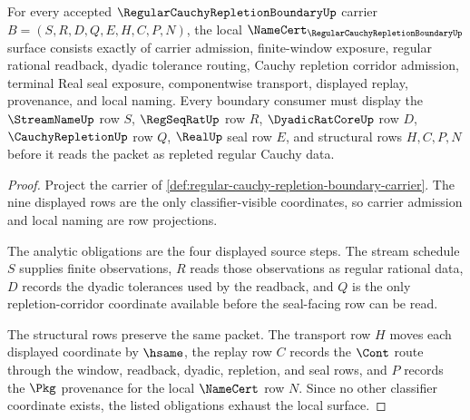 \begin{theorem}
\label{thm:regular-cauchy-repletion-boundary-namecert-obligations}
For every accepted $\RegularCauchyRepletionBoundaryUp$ carrier $B=(S,R,D,Q,E,H,C,P,N)$, the local $\NameCert_{\RegularCauchyRepletionBoundaryUp}$ surface consists exactly of carrier admission, finite-window exposure, regular rational readback, dyadic tolerance routing, Cauchy repletion corridor admission, terminal Real seal exposure, componentwise transport, displayed replay, provenance, and local naming. Every boundary consumer must display the $\StreamNameUp$ row $S$, $\RegSeqRatUp$ row $R$, $\DyadicRatCoreUp$ row $D$, $\CauchyRepletionUp$ row $Q$, $\RealUp$ seal row $E$, and structural rows $H,C,P,N$ before it reads the packet as repleted regular Cauchy data.
\end{theorem}
\begin{proof}
Project the carrier of \autoref{def:regular-cauchy-repletion-boundary-carrier}. The nine displayed rows are the only classifier-visible coordinates, so carrier admission and local naming are row projections.

The analytic obligations are the four displayed source steps. The stream schedule $S$ supplies finite observations, $R$ reads those observations as regular rational data, $D$ records the dyadic tolerances used by the readback, and $Q$ is the only repletion-corridor coordinate available before the seal-facing row can be read.

The structural rows preserve the same packet. The transport row $H$ moves each displayed coordinate by $\hsame$, the replay row $C$ records the $\Cont$ route through the window, readback, dyadic, repletion, and seal rows, and $P$ records the $\Pkg$ provenance for the local $\NameCert$ row $N$. Since no other classifier coordinate exists, the listed obligations exhaust the local surface.
\end{proof}

